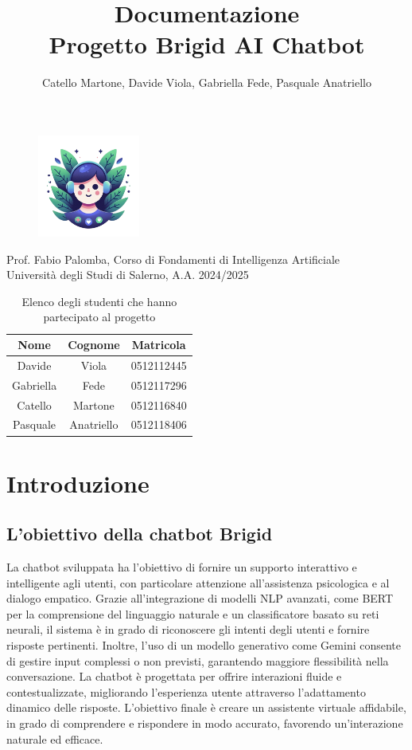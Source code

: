 \documentclass[12pt, letterpaper]{article}
\title{\Huge \textbf{Documentazione}\\[0.5cm]
\Large \textbf{Progetto Brigid AI Chatbot}}
\author{\large Catello Martone, Davide Viola, Gabriella Fede, Pasquale Anatriello}
\begin{document}
	
\begin{figure}[t]
\centering
\includegraphics[width=0.3\textwidth]{immagini/brigid.png}
\end{figure}
	
\maketitle
\vfill
\begin{center}
Prof. Fabio Palomba, Corso di Fondamenti di Intelligenza Artificiale\\
Università degli Studi di Salerno, A.A. 2024/2025
\end{center}
	
\newpage
\tableofcontents
\begin{table}[h]
	\centering
	\begin{tabular}{|c|c|c|}
		\hline
		\textbf{Nome} & \textbf{Cognome} & \textbf{Matricola} \\
		\hline
		Davide   & Viola      & 0512112445 \\
		Gabriella & Fede      & 0512117296 \\
		Catello  & Martone    & 0512116840 \\
		Pasquale & Anatriello & 0512118406 \\
		\hline
	\end{tabular}
	\caption{Elenco degli studenti che hanno partecipato al progetto}
	\label{tab:studenti}
\end{table}
\newpage
	
\section{Introduzione}	
\subsection{L'obiettivo della chatbot Brigid}
La chatbot sviluppata ha l’obiettivo di fornire un supporto interattivo e intelligente agli utenti, con particolare attenzione all'assistenza psicologica e al dialogo empatico. Grazie all’integrazione di modelli NLP avanzati, come BERT per la comprensione del linguaggio naturale e un classificatore basato su reti neurali, il sistema è in grado di riconoscere gli intenti degli utenti e fornire risposte pertinenti. Inoltre, l’uso di un modello generativo come Gemini consente di gestire input complessi o non previsti, garantendo maggiore flessibilità nella conversazione. La chatbot è progettata per offrire interazioni fluide e contestualizzate, migliorando l’esperienza utente attraverso l’adattamento dinamico delle risposte. L’obiettivo finale è creare un assistente virtuale affidabile, in grado di comprendere e rispondere in modo accurato, favorendo un’interazione naturale ed efficace.
\end{document}
